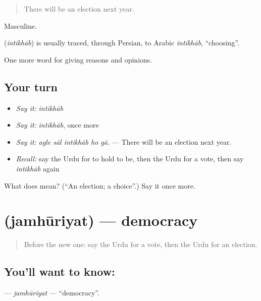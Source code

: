 \begin{quote}
There will be an election next year.
\end{quote}

Masculine.

\begin{cousinweb}
\textbf{} (\emph{intikhāb}) is usually traced, through Persian, to Arabic \emph{intikhāb}, \textquotedblleft{}choosing\textquotedblright{}.
\end{cousinweb}

\begin{grammarlens}[title={What you've built}]
One more word for giving reasons and opinions.
\end{grammarlens}

\subsection*{Your turn}
\begin{itemize}
\raggedright
  \item \emph{Say it:} \emph{intikhāb}
  \item \emph{Say it:} \emph{intikhāb}, once more
  \item \emph{Say it:} \emph{agle sāl intikhāb ho gā.} — There will be an election next year.
  \item \emph{Recall:} say the Urdu for to hold to be, then the Urdu for a vote, then say \emph{intikhāb} again
\end{itemize}

\begin{tcolorbox}[breakable,colback=teal!4,colframe=teal!35!black,title={Before you move on}]
What does  mean? (\textquotedblleft{}An election; a choice\textquotedblright{}.) Say it once more.
\end{tcolorbox}
\section[\texorpdfstring{\ur{جمہوریت} (jamhūriyat)}{جمہوریت (jamhūriyat)}]{ (jamhūriyat) — democracy}

\label{lesson:UR-C342-jamhuriyat}



\begin{quote}
Before the new one: say the Urdu for a vote, then the Urdu for an election.
\end{quote}

\subsection*{You'll want to know: }
\textbf{} — \emph{jamhūriyat} — \textquotedblleft{}democracy\textquotedblright{}.

